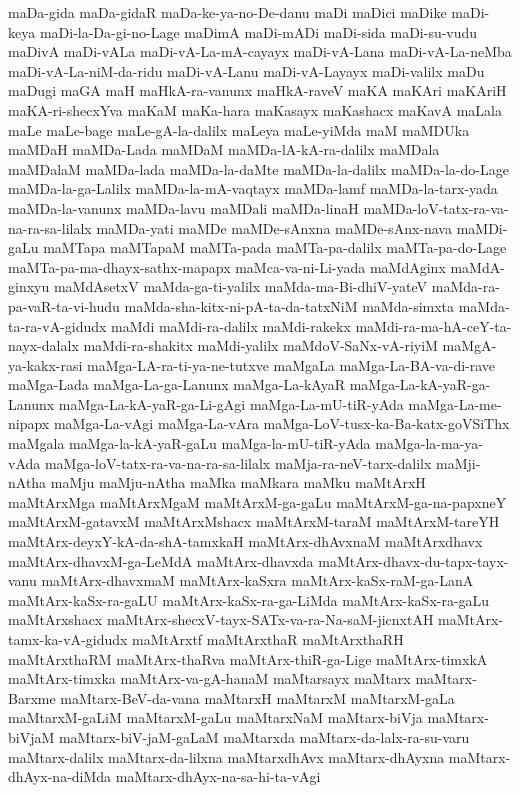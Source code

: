 {maDa-gida
maDa-gidaR
maDa-ke-ya-no-De-danu
maDi
maDici
maDike
maDi-keya
maDi-la-Da-gi-no-Lage
maDimA
maDi-mADi
maDi-sida
maDi-su-vudu
maDivA
maDi-vALa
maDi-vA-La-mA-cayayx
maDi-vA-Lana
maDi-vA-La-neMba
maDi-vA-La-niM-da-ridu
maDi-vA-Lanu
maDi-vA-Layayx
maDi-valilx
maDu
maDugi
maGA
maH
maHkA-ra-vanunx
maHkA-raveV
maKA
maKAri
maKAriH
maKA-ri-shecxYva
maKaM
maKa-hara
maKasayx
maKashacx
maKavA
maLala
maLe
maLe-bage
maLe-gA-la-dalilx
maLeya
maLe-yiMda
maM
maMDUka
maMDaH
maMDa-Lada
maMDaM
maMDa-lA-kA-ra-dalilx
maMDala
maMDalaM
maMDa-lada
maMDa-la-daMte
maMDa-la-dalilx
maMDa-la-do-Lage
maMDa-la-ga-Lalilx
maMDa-la-mA-vaqtayx
maMDa-lamf
maMDa-la-tarx-yada
maMDa-la-vanunx
maMDa-lavu
maMDali
maMDa-linaH
maMDa-loV-tatx-ra-va-na-ra-sa-lilalx
maMDa-yati
maMDe
maMDe-sAnxna
maMDe-sAnx-nava
maMDi-gaLu
maMTapa
maMTapaM
maMTa-pada
maMTa-pa-dalilx
maMTa-pa-do-Lage
maMTa-pa-ma-dhayx-sathx-mapapx
maMca-va-ni-Li-yada
maMdAginx
maMdA-ginxyu
maMdAsetxV
maMda-ga-ti-yalilx
maMda-ma-Bi-dhiV-yateV
maMda-ra-pa-vaR-ta-vi-hudu
maMda-sha-kitx-ni-pA-ta-da-tatxNiM
maMda-simxta
maMda-ta-ra-vA-gidudx
maMdi
maMdi-ra-dalilx
maMdi-rakekx
maMdi-ra-ma-hA-ceY-ta-nayx-dalalx
maMdi-ra-shakitx
maMdi-yalilx
maMdoV-SaNx-vA-riyiM
maMgA-ya-kakx-rasi
maMga-LA-ra-ti-ya-ne-tutxve
maMgaLa
maMga-La-BA-va-di-rave
maMga-Lada
maMga-La-ga-Lanunx
maMga-La-kAyaR
maMga-La-kA-yaR-ga-Lanunx
maMga-La-kA-yaR-ga-Li-gAgi
maMga-La-mU-tiR-yAda
maMga-La-me-nipapx
maMga-La-vAgi
maMga-La-vAra
maMga-LoV-tusx-ka-Ba-katx-goVSiThx
maMgala
maMga-la-kA-yaR-gaLu
maMga-la-mU-tiR-yAda
maMga-la-ma-ya-vAda
maMga-loV-tatx-ra-va-na-ra-sa-lilalx
maMja-ra-neV-tarx-dalilx
maMji-nAtha
maMju
maMju-nAtha
maMka
maMkara
maMku
maMtArxH
maMtArxMga
maMtArxMgaM
maMtArxM-ga-gaLu
maMtArxM-ga-na-papxneY
maMtArxM-gatavxM
maMtArxMshacx
maMtArxM-taraM
maMtArxM-tareYH
maMtArx-deyxY-kA-da-shA-tamxkaH
maMtArx-dhAvxnaM
maMtArxdhavx
maMtArx-dhavxM-ga-LeMdA
maMtArx-dhavxda
maMtArx-dhavx-du-tapx-tayx-vanu
maMtArx-dhavxmaM
maMtArx-kaSxra
maMtArx-kaSx-raM-ga-LanA
maMtArx-kaSx-ra-gaLU
maMtArx-kaSx-ra-ga-LiMda
maMtArx-kaSx-ra-gaLu
maMtArxshacx
maMtArx-shecxV-tayx-SATx-va-ra-Na-saM-jicnxtAH
maMtArx-tamx-ka-vA-gidudx
maMtArxtf
maMtArxthaR
maMtArxthaRH
maMtArxthaRM
maMtArx-thaRva
maMtArx-thiR-ga-Lige
maMtArx-timxkA
maMtArx-timxka
maMtArx-va-gA-hanaM
maMtarsayx
maMtarx
maMtarx-Barxme
maMtarx-BeV-da-vana
maMtarxH
maMtarxM
maMtarxM-gaLa
maMtarxM-gaLiM
maMtarxM-gaLu
maMtarxNaM
maMtarx-biVja
maMtarx-biVjaM
maMtarx-biV-jaM-gaLaM
maMtarxda
maMtarx-da-lalx-ra-su-varu
maMtarx-dalilx
maMtarx-da-lilxna
maMtarxdhAvx
maMtarx-dhAyxna
maMtarx-dhAyx-na-diMda
maMtarx-dhAyx-na-sa-hi-ta-vAgi
}
